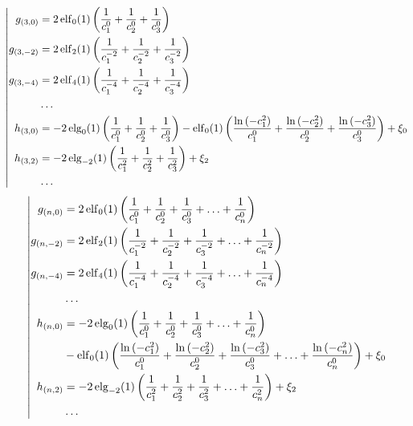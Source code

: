\begin{equation*} \left| \begin{aligned}
g_{(3,0)} &=
  2 \elf_0(1) \left(
  \frac{1}{c_1^0}
+ \frac{1}{c_2^0}
+ \frac{1}{c_3^0} \right) \\
%
g_{(3,-2)} &=
  2 \elf_2(1) \left(
  \frac{1}{c_1^{-2}}
+ \frac{1}{c_2^{-2}}
+ \frac{1}{c_3^{-2}} \right) \\
%
g_{(3,-4)} &=
  2 \elf_4(1) \left(
  \frac{1}{c_1^{-4}}
+ \frac{1}{c_2^{-4}}
+ \frac{1}{c_3^{-4}} \right) \\
%
&\ldots \\
%
h_{(3,0)} &=
- 2 \elg_0(1) \left(
  \frac{1}{c_1^0}
+ \frac{1}{c_2^0}
+ \frac{1}{c_3^0} \right)
- \elf_0(1) \left(
  \frac{\ln{(-c_1^2)}}{c_1^0}
+ \frac{\ln{(-c_2^2)}}{c_2^0}
+ \frac{\ln{(-c_3^2)}}{c_3^0} \right)
+ \xi_0 \\
%
h_{(3,2)} &=
- 2 \elg_{-2}(1) \left(
  \frac{1}{c_1^2}
+ \frac{1}{c_2^2}
+ \frac{1}{c_3^2} \right)
+ \xi_2 \\
%
&\ldots \\
\end{aligned} \right. \end{equation*}
%
\begin{equation*} \left| \begin{aligned}
g_{(n,0)} &=
  2 \elf_0(1) \left(
  \frac{1}{c_1^0}
+ \frac{1}{c_2^0}
+ \frac{1}{c_3^0}
+ \ldots
+ \frac{1}{c_n^0} \right) \\
%
g_{(n,-2)} &=
  2 \elf_2(1) \left(
  \frac{1}{c_1^{-2}}
+ \frac{1}{c_2^{-2}}
+ \frac{1}{c_3^{-2}}
+ \ldots
+ \frac{1}{c_n^{-2}} \right) \\
%
g_{(n,-4)} &=
  2 \elf_4(1) \left(
  \frac{1}{c_1^{-4}}
+ \frac{1}{c_2^{-4}}
+ \frac{1}{c_3^{-4}}
+ \ldots
+ \frac{1}{c_n^{-4}} \right) \\
%
&\ldots \\
%
h_{(n,0)} &=
- 2 \elg_0(1) \left(
  \frac{1}{c_1^0}
+ \frac{1}{c_2^0}
+ \frac{1}{c_3^0}
+ \ldots
+ \frac{1}{c_n^0} \right) \\ &
- \elf_0(1) \left(
  \frac{\ln{(-c_1^2)}}{c_1^0}
+ \frac{\ln{(-c_2^2)}}{c_2^0}
+ \frac{\ln{(-c_3^2)}}{c_3^0}
+ \ldots
+ \frac{\ln{(-c_n^2)}}{c_n^0} \right)
+ \xi_0 \\
%
h_{(n,2)} &=
- 2 \elg_{-2}(1) \left(
  \frac{1}{c_1^2}
+ \frac{1}{c_2^2}
+ \frac{1}{c_3^2}
+ \ldots
+ \frac{1}{c_n^2} \right)
+ \xi_2 \\
%
&\ldots \\
\end{aligned} \right. \end{equation*}